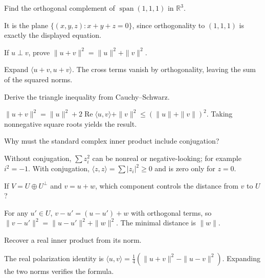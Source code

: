 \begin{problem}\label{prob:i13-problem-04}
Find the orthogonal complement of $\operatorname{span}(1,1,1)$ in $\mathbb R^3$.
\end{problem}
\begin{solution}
It is the plane $\{(x,y,z):x+y+z=0\}$, since orthogonality to $(1,1,1)$ is exactly the displayed equation.
\end{solution}

\begin{problem}[Pythagoras]\label{prob:i13-problem-05}
If $u\perp v$, prove $\|u+v\|^2=\|u\|^2+\|v\|^2$.
\end{problem}
\begin{solution}
Expand $\langle u+v,u+v\rangle$. The cross terms vanish by orthogonality, leaving the sum of the squared norms.
\end{solution}

\begin{problem}\label{prob:i13-problem-06}
Derive the triangle inequality from Cauchy–Schwarz.
\end{problem}
\begin{solution}
$\|u+v\|^2=\|u\|^2+2\operatorname{Re}\langle u,v\rangle+\|v\|^2\le(\|u\|+\|v\|)^2$. Taking nonnegative square roots yields the result.
\end{solution}

\begin{problem}\label{prob:i13-problem-07}
Why must the standard complex inner product include conjugation?
\end{problem}
\begin{solution}
Without conjugation, $\sum z_i^2$ can be nonreal or negative-looking; for example $i^2=-1$. With conjugation, $\langle z,z\rangle=\sum|z_i|^2\ge0$ and is zero only for $z=0$.
\end{solution}

\begin{problem}\label{prob:i13-problem-08}
If $V=U\oplus U^\perp$ and $v=u+w$, which component controls the distance from $v$ to $U$?
\end{problem}
\begin{solution}
For any $u'\in U$, $v-u'=(u-u')+w$ with orthogonal terms, so $\|v-u'\|^2=\|u-u'\|^2+\|w\|^2$. The minimal distance is $\|w\|$.
\end{solution}

\begin{problem}[Polarization]\label{prob:i13-problem-09}
Recover a real inner product from its norm.
\end{problem}
\begin{solution}
The real polarization identity is $\langle u,v\rangle=\frac14(\|u+v\|^2-\|u-v\|^2)$. Expanding the two norms verifies the formula.
\end{solution}

